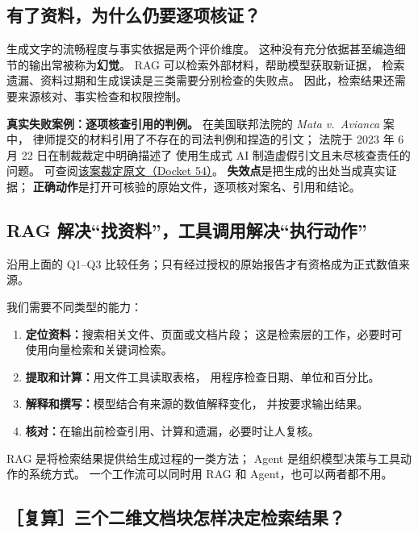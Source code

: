 \subsection{有了资料，为什么仍要逐项核证？}
\label{partq:assistant}

生成文字的流畅程度与事实依据是两个评价维度。
这种没有充分依据甚至编造细节的输出常被称为\textbf{幻觉}。
RAG 可以检索外部材料，帮助模型获取新证据，
检索遗漏、资料过期和生成误读是三类需要分别检查的失败点。
因此，检索结果还需要来源核对、事实检查和权限控制。

\begin{casebox}
\textbf{真实失败案例：逐项核查引用的判例。}
在美国联邦法院的 \emph{Mata v.\ Avianca} 案中，
律师提交的材料引用了不存在的司法判例和捏造的引文；
法院于 2023 年 6 月 22 日在制裁裁定中明确描述了
使用生成式 AI 制造虚假引文且未尽核查责任的问题。
可查阅\href{https://law.justia.com/cases/federal/district-courts/new-york/nysdce/1:2022cv01461/575368/54/}{该案裁定原文（Docket 54）}。
\textbf{失效点}是把生成的出处当成真实证据；
\textbf{正确动作}是打开可核验的原始文件，逐项核对案名、引用和结论。
\end{casebox}

\subsection{RAG 解决“找资料”，工具调用解决“执行动作”}
\label{concept:rag}

沿用上面的 Q1--Q3 比较任务；只有经过授权的原始报告才有资格成为正式数值来源。

我们需要不同类型的能力：
\begin{enumerate}
\item \textbf{定位资料：}搜索相关文件、页面或文档片段；
这是检索层的工作，必要时可使用向量检索和关键词检索。
\item \textbf{提取和计算：}用文件工具读取表格，
用程序检查日期、单位和百分比。
\item \textbf{解释和撰写：}模型结合有来源的数值解释变化，
并按要求输出结果。
\item \textbf{核对：}在输出前检查引用、计算和遗漏，必要时让人复核。
\end{enumerate}
RAG 是将检索结果提供给生成过程的一类方法；
Agent 是组织模型决策与工具动作的系统方式。
一个工作流可以同时用 RAG 和 Agent，也可以两者都不用。


\subsection{［复算］三个二维文档块怎样决定检索结果？}
\label{concept:vector-retrieval}


